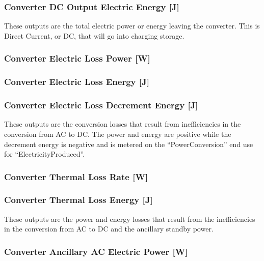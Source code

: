 \subsubsection{Converter DC Output Electric Energy {[}J{]}}\label{converter-dc-output-electric-energy-j}

These outputs are the total electric power or energy leaving the converter. This is Direct Current, or DC, that will go into charging storage.

\subsubsection{Converter Electric Loss Power {[}W{]}}\label{converter-electric-loss-power-w}

\subsubsection{Converter Electric Loss Energy {[}J{]}}\label{converter-electric-loss-energy-j}

\subsubsection{Converter Electric Loss Decrement Energy {[}J{]}}\label{converter-electric-loss-decrement-energy-j}

These outputs are the conversion losses that result from inefficiencies in the conversion from AC to DC. The power and energy are positive while the decrement energy is negative and is metered on the ``PowerConversion'' end use for ``ElectricityProduced''.

\subsubsection{Converter Thermal Loss Rate {[}W{]}}\label{converter-thermal-loss-rate-w}

\subsubsection{Converter Thermal Loss Energy {[}J{]}}\label{converter-thermal-loss-energy-j}

These outputs are the power and energy losses that result from the inefficiencies in the conversion from AC to DC and the ancillary standby power.

\subsubsection{Converter Ancillary AC Electric Power {[}W{]}}\label{converter-ancillary-ac-electric-power-w}

